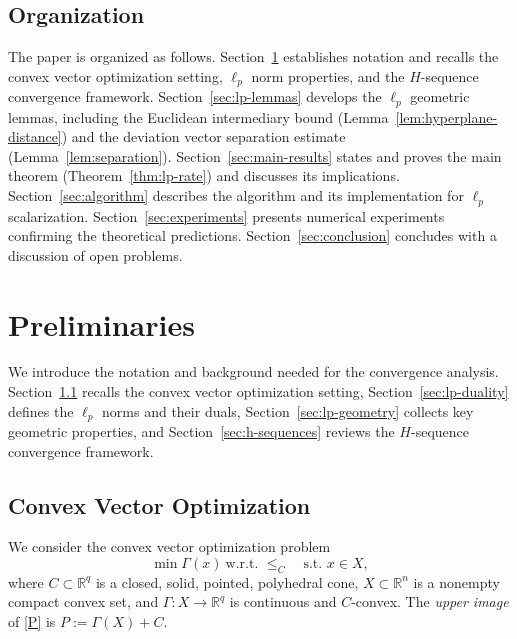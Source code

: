 \documentclass[11pt]{article}
\newcommand{\R}{\mathbb{R}}
\begin{document}
\subsection{Organization}\label{sec:organization}

The paper is organized as follows. Section~\ref{sec:prelim} establishes notation and recalls the convex vector optimization setting, $\ell_p$ norm properties, and the $H$-sequence convergence framework. Section~\ref{sec:lp-lemmas} develops the $\ell_p$ geometric lemmas, including the Euclidean intermediary bound (Lemma~\ref{lem:hyperplane-distance}) and the deviation vector separation estimate (Lemma~\ref{lem:separation}). Section~\ref{sec:main-results} states and proves the main theorem (Theorem~\ref{thm:lp-rate}) and discusses its implications. Section~\ref{sec:algorithm} describes the algorithm and its implementation for $\ell_p$ scalarization. Section~\ref{sec:experiments} presents numerical experiments confirming the theoretical predictions. Section~\ref{sec:conclusion} concludes with a discussion of open problems.

\section{Preliminaries}\label{sec:prelim}

We introduce the notation and background needed for the convergence analysis. Section~\ref{sec:cvop} recalls the convex vector optimization setting, Section~\ref{sec:lp-duality} defines the $\ell_p$ norms and their duals, Section~\ref{sec:lp-geometry} collects key geometric properties, and Section~\ref{sec:h-sequences} reviews the $H$-sequence convergence framework.

\subsection{Convex Vector Optimization}\label{sec:cvop}

We consider the convex vector optimization problem
\begin{equation}\label{P}
\tag{P}
\min \Gamma(x) \ \text{w.r.t. }\le_C \quad\text{s.t. } x\in X,
\end{equation}
where $C \subset \R^q$ is a closed, solid, pointed, polyhedral cone, $X \subset \R^n$ is a nonempty compact convex set, and $\Gamma: X \to \R^q$ is continuous and $C$-convex. The \emph{upper image} of \eqref{P} is $P := \Gamma(X) + C$.
\end{document}
